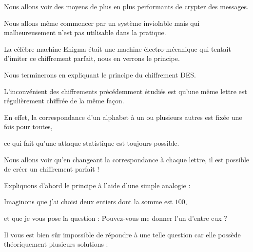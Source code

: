 







\debuttexte


\diapo

\change

Nous allons voir des moyens de plus en plus performants de crypter des messages.

\change

Nous allons même commencer par un système inviolable mais qui 
malheureusement n'est pas utilisable dans la pratique.

\change

La célèbre machine Enigma était une machine électro-mécanique qui tentait d'imiter ce chiffrement parfait, nous en verrons le principe.

\change

Nous terminerons en expliquant le principe du chiffrement DES.

\diapo

L'inconvénient des chiffrements précédemment étudiés est qu'une même lettre est régulièrement chiffrée de la même façon.


En effet, la correspondance d'un alphabet à un ou plusieurs autres est fixée une fois pour toutes,

\change

ce qui fait qu'une attaque statistique est toujours possible.

\change

Nous allons voir qu'en changeant la correspondance à chaque lettre, il est possible de créer un chiffrement 
parfait !

\change

Expliquons d'abord le principe à l'aide d'une simple analogie :

\change

Imaginons que j'ai choisi deux entiers dont la somme est $100$,

et que je vous pose la question : Pouvez-vous me donner l'un d'entre eux ? 

\change

Il vous est bien sûr impossible de répondre à une telle question car elle possède théoriquement plusieurs solutions :

